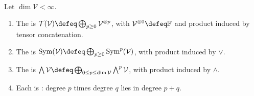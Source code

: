 \begin{definition} \label{def:graded-tensor-symmetric-exterior-algebras} \\
Let $\dim\mathcal{V}<\infty$.
\begin{enumerate}[label=(\roman*)]
\setlength{\itemsep}{0pt}
\item The  is $\mathcal{T}(\mathcal{V})\defeq\bigoplus_{p\geq0}\mathcal{V}^{\otimes p}$, with $\mathcal{V}^{\otimes0}\defeq\mathbb{F}$ and product induced by tensor concatenation.
\item The  is $\operatorname{Sym}(\mathcal{V})\defeq\bigoplus_{p\geq0}\operatorname{Sym}^{p}(\mathcal{V})$, with product induced by $\vee$.
\item The  is $\bigwedge\mathcal{V}\defeq\bigoplus_{0\leq p\leq\dim\mathcal{V}}\bigwedge^{p}\mathcal{V}$, with product induced by $\wedge$.
\item Each is : degree $p$ times degree $q$ lies in degree $p+q$.
\end{enumerate}
\end{definition}
